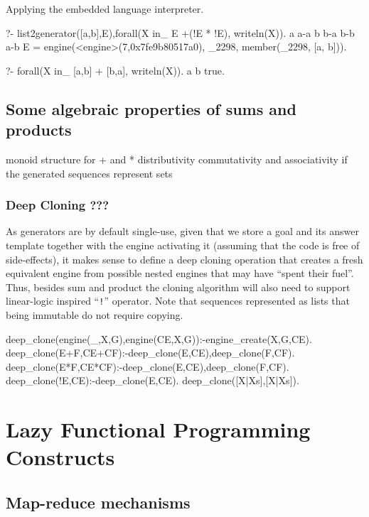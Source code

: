 \documentclass{new_tlp}
\begin{document}
\BX
Applying the embedded language interpreter.
\begin{codex}
?- list2generator([a,b],E),forall(X in_ E +(!E * !E), writeln(X)).
a
a-a
b
b-a
b-b
a-b
E = engine(<engine>(7,0x7fe9b80517a0), _2298, member(_2298, [a, b])).

?- forall(X in_ {[a,b] + [b,a]}, writeln(X)).
a
b
true.
\end{codex}

\EX
\subsection{Some algebraic properties of sums and products}

\BI
\I monoid structure for + and *
\I distributivity
\I commutativity and associativity if the generated sequences represent sets
\EI

\begin{code}
\end{code}

\subsubsection{Deep Cloning ???}

As generators are by default single-use, given that we store a goal and its answer template together with the engine activating it (assuming that the code is free of side-effects), it makes sense to define a deep cloning operation that creates a fresh equivalent engine from possible nested engines that may have ``spent their fuel''.
Thus, besides  sum and product  the cloning algorithm will also need to support
linear-logic inspired ``{\tt !}'' operator. Note that sequences represented as lists that being immutable do not require copying.
\begin{code}

deep_clone(engine(_,X,G),engine(CE,X,G)):-engine_create(X,G,CE).
deep_clone(E+F,CE+CF):-deep_clone(E,CE),deep_clone(F,CF).
deep_clone(E*F,CE*CF):-deep_clone(E,CE),deep_clone(F,CF).
deep_clone(!E,CE):-deep_clone(E,CE).
deep_clone([X|Xs],[X|Xs]).
\end{code}


\section{Lazy Functional Programming Constructs}

\subsection{Map-reduce mechanisms}
\end{document}
